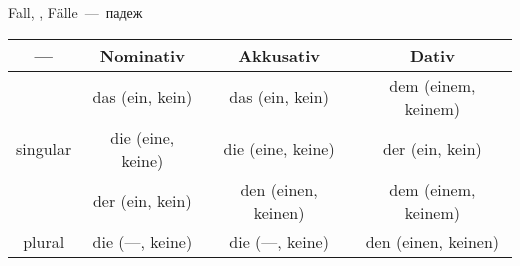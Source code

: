 
 Fall, , F\"alle~---~падеж

\begin{longtable}{|c|c|c|c|}
\hline
--- & Nominativ & Akkusativ & Dativ \\
\hline
\multirow{3}{*}{singular} & das (ein, kein) & das (ein, kein) & dem (einem, keinem) \\
 & die (eine, keine) & die (eine, keine) & der (ein, kein) \\
 & der (ein, kein) & den (einen, keinen) & dem (einem, keinem) \\
\hline
plural & die (---, keine) & die (---, keine) & den (einen, keinen) \\
\hline
\end{longtable}

